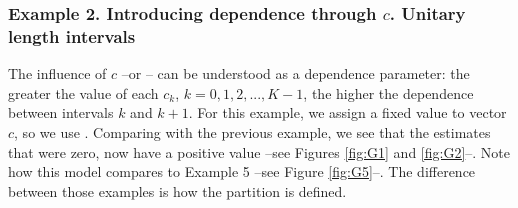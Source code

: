 \documentclass[letterpaper]{article}\usepackage[]{graphicx}\usepackage[]{color}
\begin{document}
\subsubsection{Example 2. Introducing dependence through $c$. Unitary length intervals}

The influence of $c$ --or -- can be understood as a dependence parameter: the greater the value of each $c_k$, $k=0,1,2,...,K-1$, the higher the dependence between intervals $k$ and $k+1$. For this example, we assign a fixed value to vector $c$, so we use . Comparing with the previous example, we see that the estimates that were zero, now have a positive value --see Figures \ref{fig:G1} and \ref{fig:G2}--. Note  how this model compares to Example 5 --see Figure \ref{fig:G5}--. The difference between those examples is how the partition is defined.
\end{document}
